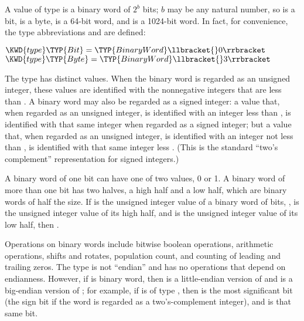 
A value of type 
is a binary word of $2^b$ bits; $b$ may be any natural number,
so 
is a bit,  is a byte,
 is a 64-bit word, and
 is a 1024-bit word.
In fact, for convenience, the type abbreviations  and 
are defined:

\begin{Fortress}
\(\KWD{type} \TYP{Bit} = \TYP{BinaryWord}\llbracket{}0\rrbracket\)\\
\(\KWD{type} \TYP{Byte} = \TYP{BinaryWord}\llbracket{}3\rrbracket\)
\end{Fortress}

The type  has 
distinct values.  When the binary word is regarded as an unsigned
integer, these values are identified with the nonnegative integers
that are less than .
A binary word may also be regarded as a signed integer:
a value that, when regarded as an unsigned integer,
is identified with an integer less than ,
is identified with that same integer when regarded as a signed integer;
but a value that, when regarded as an unsigned integer,
is identified with an integer not less than ,
is identified with that same integer less .
(This is the standard ``two's complement'' representation
for signed integers.)

A binary word of one bit can have one of two values, 0 or 1.
A binary word of more than one bit has two halves, a high half and a low half,
which are binary words of half the size.  If  is the unsigned integer value of a binary word of
 bits, ,  is the unsigned integer value of its high half,
and  is the unsigned integer value of its low half,
then .

Operations on binary words include bitwise boolean operations, arithmetic operations,
shifts and rotates, population count, and counting of leading and trailing zeros.
The type 
is not ``endian'' and has no operations that depend on endianness.
However, if  is binary word,
then  is a little-endian version of 
and  is a big-endian version of ; for example,
if  is of type , then
 is the most significant bit
(the sign bit if the word is regarded as a two's-complement integer),
and  is that same bit.


